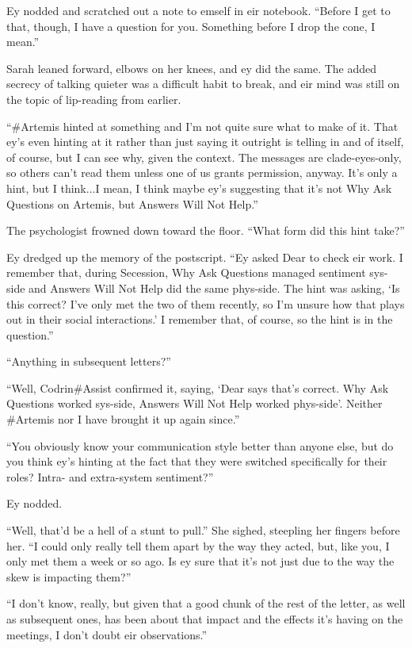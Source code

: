 Ey nodded and scratched out a note to emself in eir notebook. ``Before I get to that, though, I have a question for you. Something before I drop the cone, I mean.''

Sarah leaned forward, elbows on her knees, and ey did the same. The added secrecy of talking quieter was a difficult habit to break, and eir mind was still on the topic of lip-reading from earlier.

``\#Artemis hinted at something and I'm not quite sure what to make of it. That ey's even hinting at it rather than just saying it outright is telling in and of itself, of course, but I can see why, given the context. The messages are clade-eyes-only, so others can't read them unless one of us grants permission, anyway. It's only a hint, but I think...I mean, I think maybe ey's suggesting that it's not Why Ask Questions on Artemis, but Answers Will Not Help.''

The psychologist frowned down toward the floor. ``What form did this hint take?''

Ey dredged up the memory of the postscript. ``Ey asked Dear to check eir work. I remember that, during Secession, Why Ask Questions managed sentiment sys-side and Answers Will Not Help did the same phys-side. The hint was asking, `Is this correct? I've only met the two of them recently, so I'm unsure how that plays out in their social interactions.' I remember that, of course, so the hint is in the question.''

``Anything in subsequent letters?''

``Well, Codrin\#Assist confirmed it, saying, `Dear says that's correct. Why Ask Questions worked sys-side, Answers Will Not Help worked phys-side'. Neither \#Artemis nor I have brought it up again since.''

``You obviously know your communication style better than anyone else, but do you think ey's hinting at the fact that they were switched specifically for their roles? Intra- and extra-system sentiment?''

Ey nodded.

``Well, that'd be a hell of a stunt to pull.'' She sighed, steepling her fingers before her. ``I could only really tell them apart by the way they acted, but, like you, I only met them a week or so ago. Is ey sure that it's not just due to the way the skew is impacting them?''

``I don't know, really, but given that a good chunk of the rest of the letter, as well as subsequent ones, has been about that impact and the effects it's having on the meetings, I don't doubt eir observations.''

